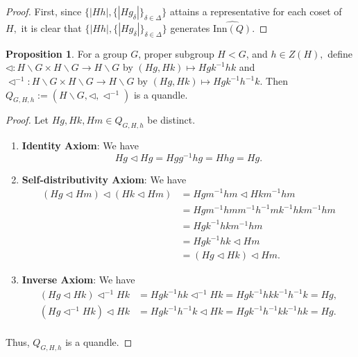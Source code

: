 \documentclass[reqno,dvipsnames]{amsart}
\newcommand{\Inn}{\text{Inn}}
\theoremstyle{definition}
\newtheorem{proposition}[theorem]{Proposition}
\begin{document}
{\begin{proof}
First, since $\{|Hh|, \{|Hg_\delta|\}_{\delta \in \Delta}\}$ attains a representative for each coset of $H,$ it is clear that $\{|Hh|, \{|Hg_\delta|\}_{\delta \in \Delta}\}$ generates $\widehat{\Inn(Q)}. $
\end{proof}

\begin{proposition}
For a group $G$, proper subgroup $H < G$, and $h \in Z(H),$ define $\triangleleft : H \backslash G \times H \backslash G \to H \backslash G$ by $(Hg, Hk) \mapsto Hgk^{-1}hk$ and $\triangleleft^{-1} : H \backslash G \times H \backslash G \to H \backslash G$ by $(Hg, Hk) \mapsto Hgk^{-1}h^{-1}k$. Then $Q_{G,H,h} := (H \backslash G, \triangleleft, \triangleleft^{-1})$ is a quandle.
\end{proposition}

\begin{proof}
Let $Hg,Hk,Hm \in Q_{G,H,h}$ be distinct.

\begin{enumerate}
    \item \textbf{Identity Axiom}: We have 
    \[Hg \triangleleft Hg = Hgg^{-1}hg = Hhg = Hg.\]
    \item \textbf{Self-distributivity Axiom}: We have
    \begin{align*}
        (Hg \triangleleft Hm) \triangleleft (Hk \triangleleft Hm) 
        &= Hgm^{-1}hm \triangleleft Hkm^{-1}hm \\
        &= Hgm^{-1}hmm^{-1}h^{-1}mk^{-1}hkm^{-1}hm \\
        &= Hgk^{-1}hkm^{-1}hm \\
        &= Hgk^{-1}hk \triangleleft Hm \\
        &= (Hg \triangleleft Hk) \triangleleft Hm.
    \end{align*}
    \item \textbf{Inverse Axiom}:
    We have
    \begin{align*}
        (Hg \triangleleft Hk) \triangleleft^{-1} Hk &= Hgk^{-1}hk \triangleleft^{-1} Hk = Hgk^{-1}hkk^{-1}h^{-1}k = Hg, \\
        (Hg \triangleleft^{-1} Hk) \triangleleft Hk &= Hgk^{-1}h^{-1}k \triangleleft Hk = Hgk^{-1}h^{-1}kk^{-1}hk = Hg. \\
    \end{align*}
\end{enumerate}
Thus, $Q_{G,H,h}$ is a quandle.
\end{proof}

}
\end{document}
